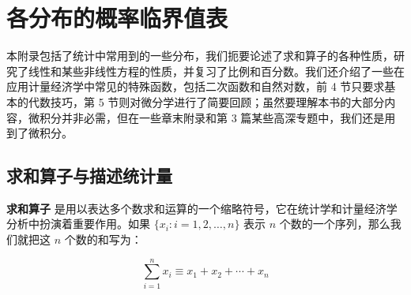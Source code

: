 \documentclass[lang=cn,10pt]{elegantbook}
\begin{document}
\nocite{*}
\printbibliography[heading=bibintoc, title=\ebibname]
\appendix

\chapter{各分布的概率临界值表}

本附录包括了统计中常用到的一些分布，我们扼要论述了求和算子的各种性质，研究了线性和某些非线性方程的性质，并复习了比例和百分数。我们还介绍了一些在应用计量经济学中常见的特殊函数，包括二次函数和自然对数，前 4 节只要求基本的代数技巧，第 5 节则对微分学进行了简要回顾；虽然要理解本书的大部分内容，微积分并非必需，但在一些章末附录和第 3 篇某些高深专题中，我们还是用到了微积分。

\section{求和算子与描述统计量}

\textbf{求和算子} 是用以表达多个数求和运算的一个缩略符号，它在统计学和计量经济学分析中扮演着重要作用。如果 $\{x_i: i=1, 2, \ldots, n\}$ 表示 $n$ 个数的一个序列，那么我们就把这 $n$ 个数的和写为：

\begin{equation}
\sum_{i=1}^n x_i \equiv x_1 + x_2 +\cdots + x_n
\end{equation}
\end{document}
